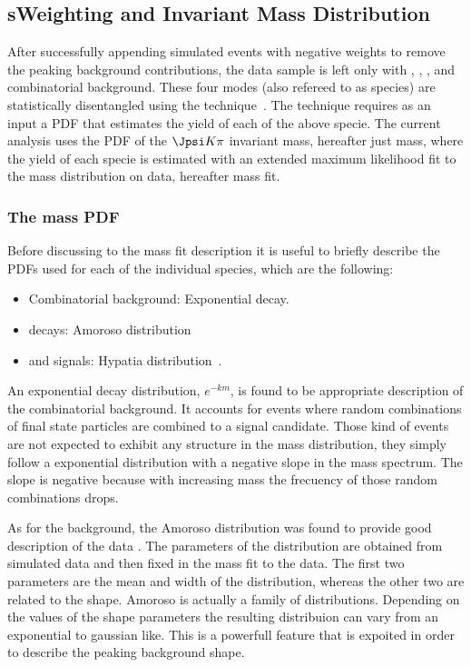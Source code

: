 \subsection{sWeighting and Invariant Mass Distribution}
\label{sWeighting_and_mass}

After successfully appending simulated events with negative weights to remove the peaking background contributions, the data sample is left only with
\BdJpsiKpi, \BsJpsiKpi, \LbJpsippi, and combinatorial background. These four modes (also refereed to as species) are statistically 
disentangled using the \sPlot technique~\cite{splot}. The technique requires as an input a PDF that estimates the yield of each 
of the above specie. The current analysis uses the PDF of the $\Jpsi K\pi$ invariant mass, hereafter just mass, where the yield of each specie
is estimated with an extended maximum likelihood fit to the mass distribution on data, hereafter mass fit. 

\subsubsection{The mass PDF}
Before discussing to the mass fit description it is useful to briefly describe the PDFs used for each of the individual species, which are the following:  

\begin{itemize}
\item Combinatorial background: Exponential decay.
\item \LbJpsippi decays: Amoroso distribution~\cite{Amoroso}
\item \Bd and \Bs signals: Hypatia distribution~\cite{Santos:2013gra}.
\end{itemize}

\noindent An exponential decay distribution, $e^{-km}$, is found to be appropriate description of the combinatorial background. It  accounts 
for events where random combinations of final state particles are combined to a signal candidate. Those kind of events are not expected to
exhibit any structure in the mass distribution, they simply follow a exponential distribution with a negative slope in the mass spectrum. The slope is
negative because with increasing mass the frecuency of those random combinations drops.  

As for the \LbJpsippi background, the Amoroso distribution was found to provide good description of the data . 
The parameters of the distribution are obtained from simulated data and then fixed in the mass fit to the data. The first two parameters
are the mean and width of the distribution, whereas the other two are related to the shape. Amoroso is actually a family of distributions. 
Depending on the values of the shape parameters the resulting distribuion can vary from an exponential to gaussian like. This is a powerfull
feature that is expoited in order to describe the \LbJpsippi peaking background shape.  

